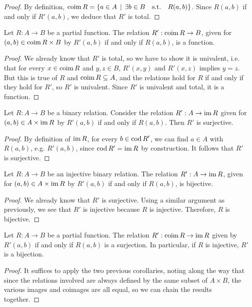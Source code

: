 \begin{proof}
	By definition, $\operatorname{\mathrm{coim}} R = \{ a \in A \, \mid \, \exists b \in B \quad \text{s.t.} \quad R(a,b) \}$. Since $R(a,b)$ if and only if $R'(a,b)$, we deduce that $R'$ is total.
\end{proof}

\begin{corollary} \label{restrict-partial-function-to-coimage-is-function}
	Let $R : A \to B$ be a partial function. The relation $R' : \operatorname{\mathrm{coim}} R \to B$, given for $(a,b) \in \operatorname{\mathrm{coim}} R \times B$ by $R'(a,b)$ if and only if $R(a,b)$, is a function. 
\end{corollary}

\begin{proof}
	We already know that $R'$ is total, so we have to show it is univalent, i.e. that for every $x \in \operatorname{\mathrm{coim}} R$ and $y,z \in B$, $R'(x,y)$ and $R'(x,z)$ implies $y=z$. But this is true of $R$ and $\operatorname{\mathrm{coim}} R \subseteq A$, and the relations hold for $R$ if and only if they hold for $R'$, so $R'$ is univalent. Since $R'$ is univalent and total, it is a function.
\end{proof}

\begin{lemma} \label{restricting-relation-to-image-is-surjective}
	Let $R : A \to B$ be a binary relation. Consider the relation $R' : A \to \operatorname{\mathrm{im}} R$ given for $(a,b) \in A \times \operatorname{\mathrm{im}} R$ by $R'(a,b)$ if and only if $R(a,b)$. Then $R'$ is surjective.
\end{lemma}

\begin{proof}
	By definition of $\operatorname{\mathrm{im}} R$, for every $b \in \operatorname{\mathrm{cod}} R'$, we can find $a \in A$ with $R(a,b)$, e.g. $R'(a,b)$, since $\operatorname{\mathrm{cod}} R' = \operatorname{\mathrm{im}} R$ by construction. It follows that $R'$ is surjective.
\end{proof}

\begin{corollary}
	Let $R : A \to B$ be an injective binary relation. The relation $R' : A \to \operatorname{\mathrm{im}} R$, given for $(a,b) \in A \times \operatorname{\mathrm{im}} R$ by $R'(a,b)$ if and only if $R(a,b)$, is bijective.
\end{corollary}

\begin{proof}
	We already know that $R'$ is surjective. Using a similar argument as previously, we see that $R'$ is injective because $R$ is injective. Therefore, $R$ is bijective.
\end{proof}

\begin{corollary} \label{restricting-relation-to-image-and-coimage-is-a-surjective-function}
	Let $R : A \to B$ be a partial function. The relation $R' : \operatorname{\mathrm{coim}} R \to \operatorname{\mathrm{im}} R$ given by $R'(a,b)$ if and only if $R(a,b)$ is a surjection. In particular, if $R$ is injective, $R'$ is a bijection.
\end{corollary}

\begin{proof}
	It suffices to apply the two previous corollaries, noting along the way that since the relations involved are always defined by the same subset of $A \times B$, the various images and coimages are all equal, so we can chain the results together.
\end{proof}
